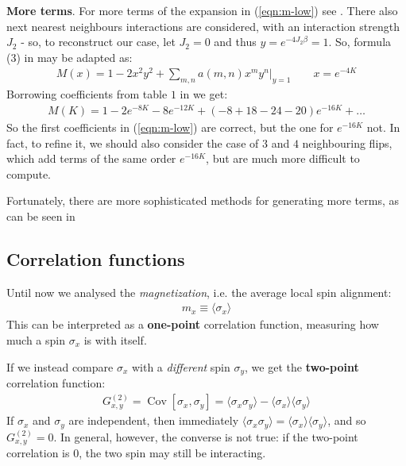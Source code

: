 \documentclass[../../main.tex]{subfiles}
\begin{document}
\begin{appr}\textbf{More terms}. For more terms of the expansion in (\ref{eqn:m-low}) see \cite{low-exp}. There also next nearest neighbours interactions are considered, with an interaction strength $J_2$ - so, to reconstruct our case, let $J_2 = 0$ and thus $y = e^{-4J_2 \beta} = 1$. So, formula (3) in \cite{low-exp} may be adapted as:
    \begin{align*}
        M(x) = 1-2x^2 y^2 + \sum_{m,n} a(m,n) x^m y^n \Big|_{y=1} \qquad x=e^{-4K}
    \end{align*}
    Borrowing coefficients from table $1$ in \cite{low-exp} we get:
    \begin{align*}
        M(K) = 1 - 2 e^{-8K} -8 e^{-12K} + (-8+ 18-24-20) e^{-16K} + \dots
    \end{align*}
    So the first coefficients in (\ref{eqn:m-low}) are correct, but the one for $e^{-16K}$ not. In fact, to refine it, we should also consider the case of $3$ and $4$ neighbouring flips, which add terms of the same order $e^{-16K}$, but are much more difficult to compute.

    \medskip

    Fortunately, there are more sophisticated methods for generating more terms, as can be seen in \cite{ising-low}
\end{appr}

\subsection{Correlation functions}
Until now we analysed the \textit{magnetization}, i.e. the average local spin alignment:
\begin{align*}
    m_x \equiv \langle \sigma_x \rangle
\end{align*} 
This can be interpreted as a \textbf{one-point} correlation function, measuring how much a spin $\sigma_x$ is  with itself.

\medskip

If we instead compare $\sigma_x$ with a \textit{different} spin $\sigma_y$, we get the \textbf{two-point} correlation function:
\begin{align}\label{eqn:two-point}
    G_{x,y}^{(2)} = \operatorname{Cov}[\sigma_x, \sigma_y] = \langle \sigma_x \sigma_y \rangle - \langle \sigma_x \rangle \langle \sigma_y \rangle
\end{align}   
If $\sigma_x$ and $\sigma_y$ are independent, then immediately $\langle \sigma_x \sigma_y \rangle = \langle \sigma_x \rangle \langle \sigma_y \rangle$, and so $G_{x,y}^{(2)} = 0$. In general, however, the converse is not true: if the two-point correlation is $0$, the two spin may still be interacting.
\end{document}
